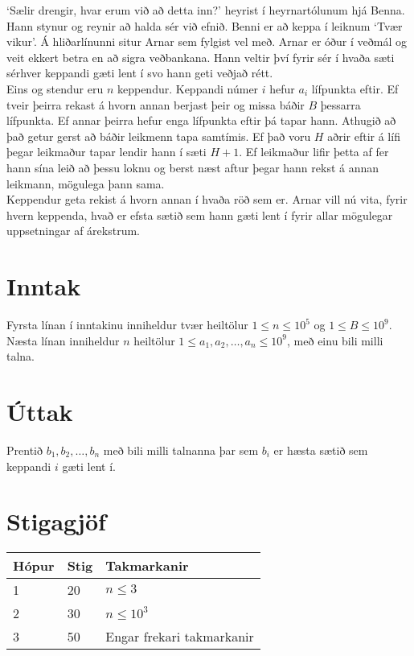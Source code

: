 
`Sælir drengir, hvar erum við að detta inn?' heyrist í heyrnartólunum hjá Benna. Hann stynur og reynir að halda sér við efnið. Benni er að 
keppa í leiknum `Tvær vikur'. Á hliðarlínunni situr Arnar sem fylgist vel með. Arnar er óður í veðmál og veit ekkert betra en að sigra veðbankana.
Hann veltir því fyrir sér í hvaða sæti sérhver keppandi gæti lent í svo hann geti veðjað rétt. \\

Eins og stendur eru $n$ keppendur. Keppandi númer $i$ hefur $a_i$ lífpunkta eftir. Ef tveir þeirra rekast á hvorn annan berjast þeir og
missa báðir $B$ þessarra lífpunkta. Ef annar þeirra hefur enga lífpunkta eftir þá tapar hann. Athugið að það getur gerst að báðir leikmenn tapa samtímis. Ef það voru $H$ aðrir eftir á lífi þegar leikmaður
tapar lendir hann í sæti $H + 1$. Ef leikmaður lifir þetta af fer hann sína leið að þessu loknu og berst næst aftur þegar hann rekst á
annan leikmann, mögulega þann sama. \\

Keppendur geta rekist á hvorn annan í hvaða röð sem er. Arnar vill nú vita, fyrir hvern keppenda, hvað er efsta sætið sem hann gæti
lent í fyrir allar mögulegar uppsetningar af árekstrum.

\section*{Inntak}
Fyrsta línan í inntakinu inniheldur tvær heiltölur $1 \leq n \leq 10^5$ og $1 \leq B \leq 10^9$.
Næsta línan inniheldur $n$ heiltölur $1 \leq a_1, a_2, \dots, a_n \leq 10^9$, með einu bili milli talna.

\section*{Úttak}
Prentið $b_1, b_2, \dots, b_n$ með bili milli talnanna þar sem $b_i$ er hæsta sætið sem keppandi $i$ gæti lent í.

\section*{Stigagjöf}
\begin{tabular}{|l|l|l|}
\hline
Hópur & Stig & Takmarkanir \\ \hline
1     & 20   & $n \leq 3$ \\ \hline
2     & 30   & $n \leq 10^3$ \\ \hline
3     & 50   & Engar frekari takmarkanir \\ \hline
\end{tabular}

